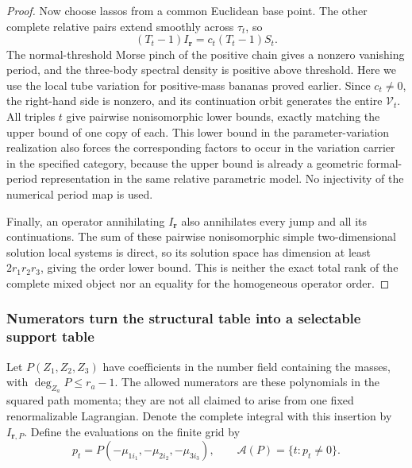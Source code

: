 \documentclass[11pt,a4paper,oneside]{article}
\theoremstyle{plain}
\theoremstyle{definition}
\theoremstyle{remark}
\numberwithin{equation}{section}
\begin{document}
\begin{proof}
Now choose lassos from a common Euclidean base point. The other complete relative pairs extend smoothly across $\tau_t$, so
\[
 (T_t-1)I_{\mathbf r}=c_t(T_t-1)S_t .
\]
The normal-threshold Morse pinch of the positive chain gives a nonzero vanishing period, and the three-body spectral density is positive above threshold.
Here we use the local tube variation for positive-mass bananas proved earlier.
Since $c_t\ne0$, the right-hand side is nonzero, and its continuation orbit generates the entire $\mathcal V_t$.
All triples $t$ give pairwise nonisomorphic lower bounds, exactly matching the upper bound of one copy of each.
This lower bound in the parameter-variation realization also forces the corresponding factors to occur in the variation carrier in the specified category,
because the upper bound is already a geometric formal-period representation in the same relative parametric model.
No injectivity of the numerical period map is used.

Finally, an operator annihilating $I_{\mathbf r}$ also annihilates every jump and all its continuations.
The sum of these pairwise nonisomorphic simple two-dimensional solution local systems is direct,
so its solution space has dimension at least $2r_1r_2r_3$, giving the order lower bound.
This is neither the exact total rank of the complete mixed object nor an equality for the homogeneous operator order.
\end{proof}

\subsubsection{Numerators turn the structural table into a selectable support table}
Let $P(Z_1,Z_2,Z_3)$ have coefficients in the number field containing the masses, with
$\deg_{Z_a}P\le r_a-1$.
The allowed numerators are these polynomials in the squared path momenta; they are not all claimed to arise from one
fixed renormalizable Lagrangian. Denote the complete integral with this insertion by $I_{\mathbf r,P}$.
Define the evaluations on the finite grid by
\[
 p_t=P(-\mu_{1i_1},-\mu_{2i_2},-\mu_{3i_3}),\qquad
 \mathcal A(P)=\{t:p_t\ne0\}.
\]
\end{document}
